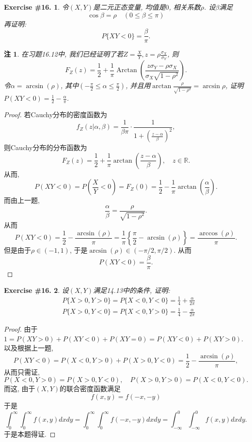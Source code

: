\documentclass[UTF8, a4paper]{article}
\newtheorem{exercise}{Exercise \#16.}
\newtheorem*{remark}{注}
\begin{document}
\begin{framed}
\begin{exercise}
令\((X,Y)\)是二元正态变量, 均值是\(0\), 相关系数\(\rho\).
设\(\beta\)满足
$$
\cos \beta=\rho \quad(0 \leq \beta \leq \pi)
$$
再证明:
$$
P\{X Y<0\}=\frac{\beta}{\pi} .
$$
\end{exercise}
\end{framed}

\begin{remark}
在习题16.12中, 我们已经证明了若\(Z = \frac{X}{Y}, z = \rho\frac{\sigma_X}{\sigma_Y}\),
则 
$$
F_Z(z)=\frac{1}{2}+\frac{1}{\pi} \operatorname{Arctan}\left(\frac{z \sigma_Y-\rho \sigma_X}{\sigma_X \sqrt{1-\rho^2}}\right) .
$$
令\(\alpha = \arcsin(\rho)\), 其中\(\left(-\frac{\pi}{2} \leq \alpha \leq \frac{\pi}{2}\right)\), 
并且用\(\arctan\frac{\rho}{\sqrt{1 - \rho^2}} = \arcsin \rho\), 证明\(P(XY < 0) = \frac{1}{2} - \frac{\alpha}{\pi}\).
\end{remark}

\begin{proof}
若Cauchy分布的密度函数为 
$$
f_Z(z|\alpha, \beta) = \frac{1}{\beta \pi} \cdot \frac{1}{1 + \left(\frac{z - \alpha}{\beta}\right)^2}, 
$$
则Cauchy分布的分布函数为
$$
F_Z(z) = \frac{1}{2} + \frac{1}{\pi} \arctan \left(\frac{z - \alpha}{\beta}\right), \quad z\in \mathbb{R}.
$$
从而,
$$
P(XY < 0) = P\left(\frac{X}{Y} < 0\right) = F_Z(0) = \frac{1}{2} - \frac{1}{\pi}\arctan\left(\frac{\alpha}{\beta}\right).
$$
而由上一题, 
$$
\frac{\alpha}{\beta} = \frac{\rho}{\sqrt{1 - \rho^2}}.
$$
从而
$$
P(XY < 0 ) = \frac{1}{2} - \frac{\arcsin(\rho)}{\pi} = \frac{1}{\pi} \left\{\frac{\pi}{2} - \arcsin(\rho)\right\} = \frac{\arccos(\rho)}{\pi}.
$$
但是由于\(\rho \in (-1, 1)\), 于是\(\arcsin(\rho) \in (-\pi/2, \pi/2)\).
从而
$$
P(XY < 0) = \frac{\beta}{\pi}.
$$
\end{proof}




\begin{framed}
\begin{exercise}
设\((X,Y)\)满足14.13中的条件, 证明:
$$
\begin{aligned}
& P\{X>0, Y>0\}=P\{X<0, Y<0\}=\frac{1}{4}+\frac{\alpha}{2 \pi} \\
& P\{X>0, Y<0\}=P\{X<0, Y>0\}=\frac{1}{4}-\frac{\alpha}{2 \pi}
\end{aligned}
$$
\end{exercise}
\end{framed}

\begin{proof}
由于\(1 = P(XY > 0) + P(XY < 0) + P(XY = 0) = P(XY < 0) + P(XY > 0)\). 以及根据上一题, 
$$
P(XY < 0) = P(X < 0, Y > 0) + P(X > 0,  Y < 0) = \frac{1}{2} - \frac{\arcsin(\rho)}{\pi}, 
$$
从而只需证, 
$$
P(X < 0, Y > 0) = P(X > 0, Y < 0), \quad P(X > 0, Y > 0) = P(X < 0, Y < 0).
$$
而这, 由于\((X,Y)\)的联合密度函数满足
$$
f(x, y) = f(-x, -y)
$$
于是 
$$
\int_{0}^{\infty} \int_{0}^{\infty} f(x, y) dx dy = \int_{0}^{\infty} \int_{0}^{\infty} f(-x, -y) dx dy = \int_{-\infty}^{0} \int_{-\infty}^{0} f(x, y) dx dy.
$$
于是本题得证.




\end{proof}
\end{document}
